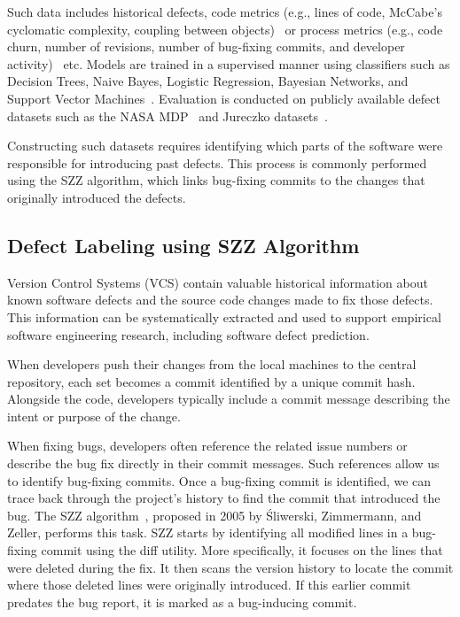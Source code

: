 \documentclass[\main/thesis.tex]{subfiles}
\begin{document}
Such data includes historical defects, code metrics (e.g., lines of code, McCabe's cyclomatic complexity, coupling between objects)~\cite{ck1994,martin1994} or process metrics (e.g., code churn, number of revisions, number of bug-fixing commits, and developer activity)~\cite{nagappan2005} etc. Models are trained in a supervised manner using classifiers such as Decision Trees, Naive Bayes, Logistic Regression, Bayesian Networks, and Support Vector Machines~\cite{lessmann2008bench}. Evaluation is conducted on publicly available defect datasets such as the NASA MDP~\cite{gray2012reflections} and Jureczko datasets~\cite{Jureckzo}.

Constructing such datasets requires identifying which parts of the software were responsible for introducing past defects. This process is commonly performed using the SZZ algorithm, which links bug-fixing commits to the changes that originally introduced the defects.


\subsection{Defect Labeling using SZZ Algorithm}
Version Control Systems (VCS) contain valuable historical information about known software defects and the source code changes made to fix those defects. This information can be systematically extracted and used to support empirical software engineering research, including software defect prediction.

When developers push their changes from the local machines to the central repository, each set becomes a commit identified by a unique commit hash. Alongside the code, developers typically include a commit message describing the intent or purpose of the change.
 

When fixing bugs, developers often reference the related issue numbers or describe the bug fix directly in their commit messages. Such references allow us to identify bug-fixing commits. Once a bug-fixing commit is identified, we can trace back through the project's history to find the commit that introduced the bug. The SZZ algorithm~\cite{szz2005}, proposed in 2005 by Śliwerski, Zimmermann, and Zeller, performs this task. SZZ starts by identifying all modified lines in a bug-fixing commit using the diff utility. More specifically, it focuses on the lines that were deleted during the fix. It then scans the version history to locate the commit where those deleted lines were originally introduced. If this earlier commit predates the bug report, it is marked as a bug-inducing commit.
\end{document}

